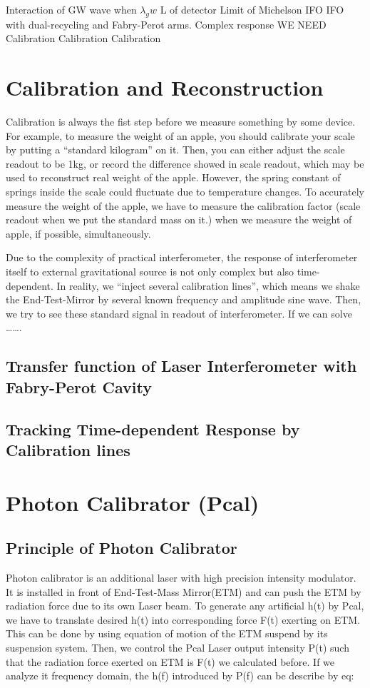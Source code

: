 Interaction of GW wave when $\lambda_gw$ L of detector
Limit of Michelson IFO
IFO with dual-recycling and Fabry-Perot  arms.
 Complex response
WE NEED Calibration Calibration Calibration



\section{Calibration and Reconstruction}

Calibration is always the fist step before we measure something by some device.
For example, to measure the weight of an apple, you should calibrate your scale by putting a “standard kilogram” on it. Then, you can either adjust the scale readout to be 1kg, or record the difference showed in scale readout, which may be used to reconstruct real weight of the apple. However, the spring constant of springs inside the scale could fluctuate due to temperature changes. To accurately measure the weight of the apple, we have to measure the calibration factor (scale readout when we put the standard mass on it.) when we measure the weight of apple, if possible, simultaneously.

Due to the complexity of practical interferometer, the response of interferometer itself to external gravitational source is not only complex but also time-dependent. In reality, we “inject several calibration lines”, which means we shake the End-Test-Mirror by several known frequency and amplitude sine wave. Then, we try to see these standard signal in readout of interferometer. If we can solve 
……. 


\subsection{Transfer function of Laser Interferometer with Fabry-Perot Cavity}
\subsection{Tracking Time-dependent Response by Calibration lines}



\section{Photon Calibrator (Pcal)}
\subsection{Principle of Photon Calibrator}
Photon calibrator is an additional laser with high precision intensity modulator. It is installed in front of End-Test-Mass Mirror(ETM) and can push the ETM by radiation force due to its own Laser beam. To generate any artificial h(t) by Pcal, we have to translate desired h(t) into corresponding force F(t) exerting on ETM. This can be done by using equation of motion of the ETM suspend by its suspension system. Then, we control the Pcal Laser output intensity P(t) such that the radiation force exerted on ETM is F(t) we calculated before. If we analyze it frequency domain,  the h(f) introduced by P(f) can be describe by eq:

